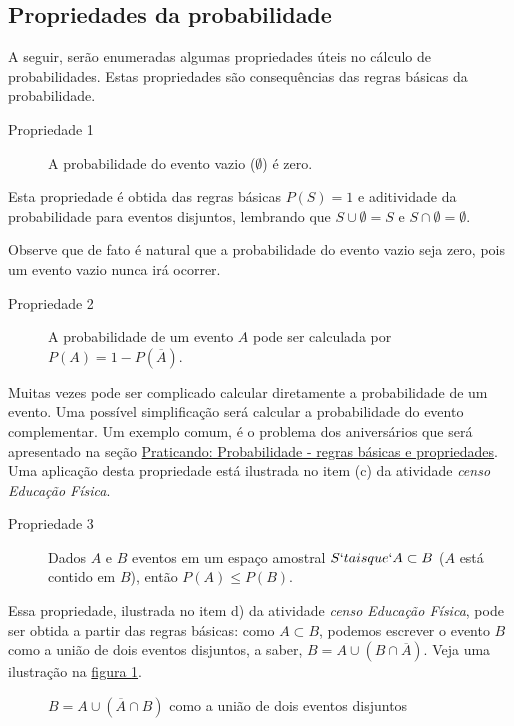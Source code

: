 \subsection{Propriedades da probabilidade}

A seguir, serão enumeradas algumas propriedades úteis no cálculo de probabilidades. Estas propriedades são consequências das regras básicas da probabilidade.

\begin{description}
\item[Propriedade 1] A probabilidade do evento vazio (\(\emptyset\)) é zero.
\end{description}

Esta propriedade é obtida das regras básicas \(P(S)=1\) e aditividade da probabilidade para eventos disjuntos, lembrando que \(S\cup \emptyset =S\) e \(S\cap \emptyset =\emptyset\).

Observe que de fato é natural que a probabilidade do evento vazio seja zero, pois um evento vazio nunca irá ocorrer.

\begin{description}
\item[Propriedade 2] A probabilidade de um evento \(A\) pode ser calculada por \(P({A})= 1-P(\overline{A})\).
\end{description}

Muitas vezes pode ser complicado calcular diretamente a probabilidade de um evento. Uma possível simplificação será calcular a probabilidade do evento complementar. Um exemplo comum, é o problema dos aniversários que será apresentado na seção \hyperref[regrasbasicaspropriedades]{Praticando: Probabilidade - regras básicas e propriedades}. Uma aplicação desta propriedade está ilustrada no item (c) da atividade \emph{censo Educação Física}.

\begin{description}
\item[Propriedade 3] Dados \(A\) e \(B\) eventos em um espaço amostral \(S`tais que `A\subset B\) (\(A\) está contido em \(B\)), então \(P(A)\leq P(B)\).
\end{description}

Essa propriedade, ilustrada no item d) da atividade \emph{censo Educação Física}, pode ser obtida a partir das regras básicas:
como \(A\subset B\), podemos escrever o evento \(B\) como a união de dois eventos disjuntos, a saber,  \(B=A\cup (B\cap \overline{A})\). Veja uma ilustração na \hyperref[eventosdijuntos]{figura \ref{eventosdijuntos}}.
\begin{figure}[H]
\centering

\caption{\(B=A\cup (\overline{A}\cap B)\) como a união de dois eventos disjuntos}
\label{eventosdijuntos}
\end{figure}


